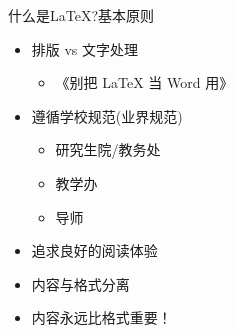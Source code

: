 \documentclass[xcolor=svgnames, t, aspectratio=169]{ctexbeamer}
\begin{document}
\begin{frame}{什么是\LaTeX?}{基本原则}
  \stretchon
  \begin{itemize}
  \item 排版 vs 文字处理
    \begin{itemize}
    \item 《别把 \LaTeX{} 当 Word 用》
    \end{itemize}
  \item 遵循\alert{学校规范}(业界规范)
    \begin{itemize}
    \item 研究生院/教务处
    \item 教学办
    \item 导师
    \end{itemize}
  \item 追求良好的阅读体验
  \item 内容与格式分离
  \item \alert{内容永远比格式重要！}
  \end{itemize}
  \stretchoff
\end{frame}
\end{document}
